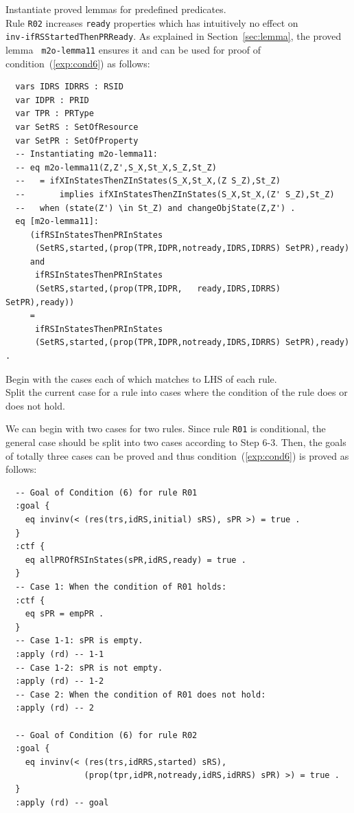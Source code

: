 \documentclass[12pt]{report}
\begin{document}
 Instantiate proved lemmas for predefined
predicates. \\ Rule {\tt R02} increases {\tt ready} properties which
has intuitively no effect on \\ {\tt inv-ifRSStartedThenPRReady}. As
explained in Section~\ref{sec:lemma}, the proved lemma {\tt
  m2o-lemma11} ensures it and can be used for proof of
condition~(\ref{exp:cond6}) as follows:
\small
\begin{verbatim}
  vars IDRS IDRRS : RSID 
  var IDPR : PRID
  var TPR : PRType
  var SetRS : SetOfResource
  var SetPR : SetOfProperty
  -- Instantiating m2o-lemma11:
  -- eq m2o-lemma11(Z,Z',S_X,St_X,S_Z,St_Z)
  --   = ifXInStatesThenZInStates(S_X,St_X,(Z S_Z),St_Z)
  --       implies ifXInStatesThenZInStates(S_X,St_X,(Z' S_Z),St_Z) 
  --   when (state(Z') \in St_Z) and changeObjState(Z,Z') .
  eq [m2o-lemma11]:
     (ifRSInStatesThenPRInStates
      (SetRS,started,(prop(TPR,IDPR,notready,IDRS,IDRRS) SetPR),ready)
     and
      ifRSInStatesThenPRInStates
      (SetRS,started,(prop(TPR,IDPR,   ready,IDRS,IDRRS) SetPR),ready))
     = 
      ifRSInStatesThenPRInStates
      (SetRS,started,(prop(TPR,IDPR,notready,IDRS,IDRRS) SetPR),ready) .
\end{verbatim}
\normalsize

 Begin with the cases each of which matches to
LHS of each rule. \\ 
 Split the current case for a rule into
cases where the condition of the rule does or does not hold. 

We can begin with two cases for two rules. Since rule {\tt R01} is
conditional, the general case should be split into two cases according
to Step 6-3. Then, the goals of totally three cases can be proved and
thus condition~(\ref{exp:cond6}) is proved as follows:
\small
\begin{verbatim}
  -- Goal of Condition (6) for rule R01
  :goal {
    eq invinv(< (res(trs,idRS,initial) sRS), sPR >) = true .
  }
  :ctf {
    eq allPROfRSInStates(sPR,idRS,ready) = true .
  }
  -- Case 1: When the condition of R01 holds:
  :ctf {
    eq sPR = empPR .
  }
  -- Case 1-1: sPR is empty.
  :apply (rd) -- 1-1
  -- Case 1-2: sPR is not empty.
  :apply (rd) -- 1-2
  -- Case 2: When the condition of R01 does not hold:
  :apply (rd) -- 2

  -- Goal of Condition (6) for rule R02
  :goal {
    eq invinv(< (res(trs,idRRS,started) sRS),
                (prop(tpr,idPR,notready,idRS,idRRS) sPR) >) = true .
  }
  :apply (rd) -- goal
\end{verbatim}
\normalsize
\end{document}
